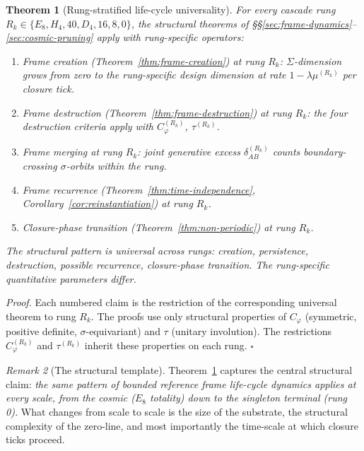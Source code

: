 \documentclass[11pt]{article}
\theoremstyle{plain}
\newtheorem{theorem}{Theorem}[section]
\theoremstyle{definition}
\theoremstyle{remark}
\newtheorem{remark}[theorem]{Remark}
\newcommand{\Cph}{C_\varphi}
\begin{document}
\begin{theorem}[Rung-stratified life-cycle universality]\label{thm:rung-universality}
For every cascade rung $R_k \in \{E_8, H_4, 40, D_4, 16, 8, 0\}$, the structural theorems of \S\S\ref{sec:frame-dynamics}--\ref{sec:cosmic-pruning} apply with rung-specific operators:

\begin{enumerate}[leftmargin=2em]
\item Frame creation (Theorem~\ref{thm:frame-creation}) at rung $R_k$: $\Sigma$-dimension grows from zero to the rung-specific design dimension at rate $1 - \lambda \mu^{(R_k)}$ per closure tick.
\item Frame destruction (Theorem~\ref{thm:frame-destruction}) at rung $R_k$: the four destruction criteria apply with $\Cph^{(R_k)}$, $\tau^{(R_k)}$.
\item Frame merging at rung $R_k$: joint generative excess $\delta^{(R_k)}_{AB}$ counts boundary-crossing $\sigma$-orbits within the rung.
\item Frame recurrence (Theorem~\ref{thm:time-independence}, Corollary~\ref{cor:reinstantiation}) at rung $R_k$.
\item Closure-phase transition (Theorem~\ref{thm:non-periodic}) at rung $R_k$.
\end{enumerate}

The structural pattern is universal across rungs: creation, persistence, destruction, possible recurrence, closure-phase transition. The rung-specific quantitative parameters differ.
\end{theorem}

\noindent\emph{Proof.} Each numbered claim is the restriction of the corresponding universal theorem to rung $R_k$. The proofs use only structural properties of $\Cph$ (symmetric, positive definite, $\sigma$-equivariant) and $\tau$ (unitary involution). The restrictions $\Cph^{(R_k)}$ and $\tau^{(R_k)}$ inherit these properties on each rung. \hfill$\square$

\begin{remark}[The structural template]\label{rem:template}
Theorem~\ref{thm:rung-universality} captures the central structural claim: \emph{the same pattern of bounded reference frame life-cycle dynamics applies at every scale, from the cosmic ($E_8$ totality) down to the singleton terminal (rung 0).} What changes from scale to scale is the size of the substrate, the structural complexity of the zero-line, and most importantly the time-scale at which closure ticks proceed.
\end{remark}
\end{document}
